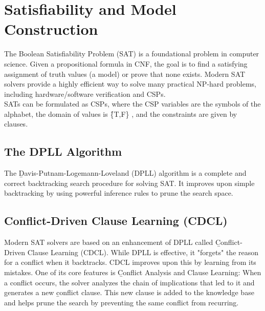 \section{Satisfiability and Model Construction}
The Boolean Satisfiability Problem (SAT) is a foundational problem in computer science. Given a propositional formula in CNF, the goal is to find a satisfying assignment of truth values (a model) or prove that none exists. Modern SAT solvers provide a highly efficient way to solve many practical NP-hard problems, including hardware/software verification and CSPs.\\
SATs can be formulated as CSPs, where the CSP variables are the symbols of the alphabet, the domain of values is \f{\left\{T,F\right\} }, and the constraints are given by clauses.

\subsection{The DPLL Algorithm}
The \b{Davis-Putnam-Logemann-Loveland (DPLL)} algorithm is a complete and correct backtracking search procedure for solving SAT. It improves upon simple backtracking by using powerful inference rules to prune the search space.
\vspace{0.5em}

\subsection{Conflict-Driven Clause Learning (CDCL)}
Modern SAT solvers are based on an enhancement of DPLL called \b{Conflict-Driven Clause Learning (CDCL)}.  While DPLL is effective, it "forgets" the reason for a conflict when it backtracks. CDCL improves upon this by learning from its mistakes.  One of its core features is \b{Conflict Analysis and Clause Learning:} When a conflict occurs, the solver analyzes the chain of implications that led to it and generates a new \b{conflict clause}.  This new clause is added to the knowledge base and helps prune the search by preventing the same conflict from recurring.

